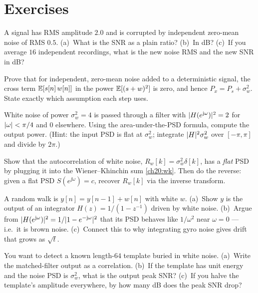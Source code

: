 \section{Exercises}
\label{ch20:exercises}

\begin{exercise}
A signal has RMS amplitude $2.0$ and is corrupted by independent zero-mean noise
of RMS $0.5$. (a)~What is the SNR as a plain ratio? (b)~In dB? (c)~If you average
$16$ independent recordings, what is the new noise RMS and the new SNR in dB?
\end{exercise}

\begin{exercise}
Prove that for independent, zero-mean noise added to a deterministic signal, the
cross term $\operatorname{\mathbb{E}}[s[n]\,w[n]]$ in the power $\operatorname{\mathbb{E}}[(s+w)^2]$ is zero, and hence
$P_x = P_s + \sigma_w^2$. State exactly which assumption each step uses.
\end{exercise}

\begin{exercise}
White noise of power $\sigma_w^2=4$ is passed through a filter with
$\lvert H(e^{\mathrm{j}\omega})\rvert^2 = 2$ for $\lvert\omega\rvert<\pi/4$ and $0$ elsewhere. Using
the area-under-the-PSD formula, compute the output power. (Hint: the input PSD is
flat at $\sigma_w^2$; integrate $\lvert H\rvert^2\sigma_w^2$ over $[-\pi,\pi]$ and divide
by $2\pi$.)
\end{exercise}

\begin{exercise}
Show that the autocorrelation of white noise, $R_w[k]=\sigma_w^2\delta[k]$, has a
\emph{flat} PSD by plugging it into the Wiener--Khinchin sum
\eqref{ch20:wk}. Then do the reverse: given a flat PSD $S(e^{\jj\omega})=c$,
recover $R_w[k]$ via the inverse transform.
\end{exercise}

\begin{exercise}
A random walk is $y[n]=y[n-1]+w[n]$ with white $w$. (a)~Show $y$ is the output of
an integrator $H(z)=1/(1-z^{-1})$ driven by white noise. (b)~Argue from
$\lvert H(e^{\mathrm{j}\omega})\rvert^2 = 1/\lvert1-e^{-\mathrm{j}\omega}\rvert^2$ that its PSD behaves like
$1/\omega^2$ near $\omega=0$ --- i.e.\ it is brown noise. (c)~Connect this to why
integrating gyro noise gives drift that grows as $\sqrt t$.
\end{exercise}

\begin{exercise}
You want to detect a known length-$64$ template buried in white noise. (a)~Write
the matched-filter output as a correlation. (b)~If the template has unit energy
and the noise PSD is $\sigma_w^2$, what is the output peak SNR? (c)~If you halve
the template's amplitude everywhere, by how many dB does the peak SNR drop?
\end{exercise}

